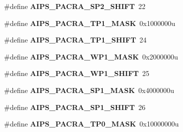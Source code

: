 \begin{DoxyCompactItemize}
\item 
\#define {\bfseries A\+I\+P\+S\+\_\+\+P\+A\+C\+R\+A\+\_\+\+S\+P2\+\_\+\+S\+H\+I\+FT}~22\hypertarget{group__AIPS__Register__Masks_ga660c0761244438dee4ecdd12e0cb436a}{}\label{group__AIPS__Register__Masks_ga660c0761244438dee4ecdd12e0cb436a}

\item 
\#define {\bfseries A\+I\+P\+S\+\_\+\+P\+A\+C\+R\+A\+\_\+\+T\+P1\+\_\+\+M\+A\+SK}~0x1000000u\hypertarget{group__AIPS__Register__Masks_gaa9ebd1bff158d65e3bb7f77c8342da1f}{}\label{group__AIPS__Register__Masks_gaa9ebd1bff158d65e3bb7f77c8342da1f}

\item 
\#define {\bfseries A\+I\+P\+S\+\_\+\+P\+A\+C\+R\+A\+\_\+\+T\+P1\+\_\+\+S\+H\+I\+FT}~24\hypertarget{group__AIPS__Register__Masks_ga628f05d8495846197d30edcf2f2b8124}{}\label{group__AIPS__Register__Masks_ga628f05d8495846197d30edcf2f2b8124}

\item 
\#define {\bfseries A\+I\+P\+S\+\_\+\+P\+A\+C\+R\+A\+\_\+\+W\+P1\+\_\+\+M\+A\+SK}~0x2000000u\hypertarget{group__AIPS__Register__Masks_ga3e1d1ddbb4f1a72e4161ff3a3947fd37}{}\label{group__AIPS__Register__Masks_ga3e1d1ddbb4f1a72e4161ff3a3947fd37}

\item 
\#define {\bfseries A\+I\+P\+S\+\_\+\+P\+A\+C\+R\+A\+\_\+\+W\+P1\+\_\+\+S\+H\+I\+FT}~25\hypertarget{group__AIPS__Register__Masks_ga4de52ee500d270b40469284b847ad104}{}\label{group__AIPS__Register__Masks_ga4de52ee500d270b40469284b847ad104}

\item 
\#define {\bfseries A\+I\+P\+S\+\_\+\+P\+A\+C\+R\+A\+\_\+\+S\+P1\+\_\+\+M\+A\+SK}~0x4000000u\hypertarget{group__AIPS__Register__Masks_ga2dd11dbd526cf34cbe3115f557488787}{}\label{group__AIPS__Register__Masks_ga2dd11dbd526cf34cbe3115f557488787}

\item 
\#define {\bfseries A\+I\+P\+S\+\_\+\+P\+A\+C\+R\+A\+\_\+\+S\+P1\+\_\+\+S\+H\+I\+FT}~26\hypertarget{group__AIPS__Register__Masks_ga6277f8f693688829febd2a5445672be7}{}\label{group__AIPS__Register__Masks_ga6277f8f693688829febd2a5445672be7}

\item 
\#define {\bfseries A\+I\+P\+S\+\_\+\+P\+A\+C\+R\+A\+\_\+\+T\+P0\+\_\+\+M\+A\+SK}~0x10000000u\hypertarget{group__AIPS__Register__Masks_ga8e60cecb13c7963ae381bd9f4a0c9aa7}{}\label{group__AIPS__Register__Masks_ga8e60cecb13c7963ae381bd9f4a0c9aa7}


\end{DoxyCompactItemize}
